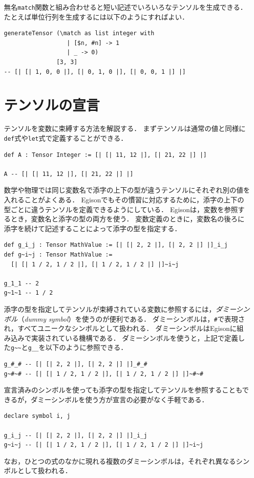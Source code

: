 無名\lstinline{match}関数と組み合わせると短い記述でいろいろなテンソルを生成できる．
たとえば単位行列を生成するには以下のようにすればよい．
\begin{lstlisting}[language=egison,numbers=none]
generateTensor (\match as list integer with
                  | [$n, #n] -> 1
                  | _ -> 0)
               [3, 3]
-- [| [| 1, 0, 0 |], [| 0, 1, 0 |], [| 0, 0, 1 |] |]
\end{lstlisting}

\section{テンソルの宣言}

テンソルを変数に束縛する方法を解説する．
まずテンソルは通常の値と同様に\lstinline{def}式や\lstinline{let}式で定義することができる．
\begin{lstlisting}[language=egison,numbers=none]
def A : Tensor Integer := [| [| 11, 12 |], [| 21, 22 |] |]

A -- [| [| 11, 12 |], [| 21, 22 |] |]
\end{lstlisting}

数学や物理では同じ変数名で添字の上下の型が違うテンソルにそれぞれ別の値を入れることがよくある．
Egisonでもその慣習に対応するために，添字の上下の型ごとに違うテンソルを定義できるようにしている．
Egisonは，変数を参照するとき，変数名と添字の型の両方を使う．
変数定義のときに，変数名の後ろに添字を続けて記述することによって添字の型を指定する．
\begin{lstlisting}[language=egison,numbers=none]
def g_i_j : Tensor MathValue := [| [| 2, 2 |], [| 2, 2 |] |]_i_j
def g~i~j : Tensor MathValue :=
  [| [| 1 / 2, 1 / 2 |], [| 1 / 2, 1 / 2 |] |]~i~j

g_1_1 -- 2
g~1~1 -- 1 / 2
\end{lstlisting}

添字の型を指定してテンソルが束縛されている変数に参照するには，\emph{ダミーシンボル}（\emph{dummy symbol}）を使うのが便利である．
ダミーシンボルは，\lstinline{#}で表現され，すべてユニークなシンボルとして扱われる．
ダミーシンボルはEgisonに組み込みで実装されている機構である．
ダミーシンボルを使うと，上記で定義した\lstinline{g~~}と\lstinline{g__}を以下のように参照できる．
\begin{lstlisting}[language=egison,numbers=none]
g_#_# -- [| [| 2, 2 |], [| 2, 2 |] |]_#_#
g~#~# -- [| [| 1 / 2, 1 / 2 |], [| 1 / 2, 1 / 2 |] |]~#~#
\end{lstlisting}
宣言済みのシンボルを使っても添字の型を指定してテンソルを参照することもできるが，ダミーシンボルを使う方が宣言の必要がなく手軽である．
\begin{lstlisting}[language=egison,numbers=none]
declare symbol i, j

g_i_j -- [| [| 2, 2 |], [| 2, 2 |] |]_i_j
g~i~j -- [| [| 1 / 2, 1 / 2 |], [| 1 / 2, 1 / 2 |] |]~i~j
\end{lstlisting}
なお，ひとつの式のなかに現れる複数のダミーシンボルは，それぞれ異なるシンボルとして扱われる．

